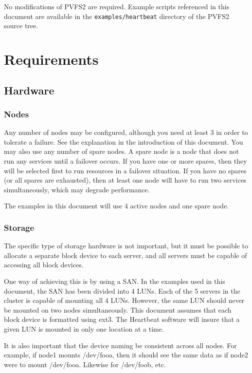 \documentclass[11pt]{article}
\begin{document}
No modifications of PVFS2 are required.  Example scripts referenced in
this document are available in the \texttt{examples/heartbeat} directory of
the PVFS2 source tree.

\section{Requirements}

\subsection{Hardware}

\subsubsection{Nodes}

Any number of nodes may be configured, although you need at least 3 in
order to tolerate a failure.  See the explanation in the introduction of
this document.  You may also use any number of spare nodes.  A spare
node is a node that does not run any services until a failover occurs.
If you have one or more spares, then they will be selected first to run
resources in a failover situation.  If you have no spares (or all spares
are exhausted), then at least one node will have to run two services
simultaneously, which may degrade performance.

The examples in this document will use 4 active nodes and one spare
node.

\subsubsection{Storage}

The specific type of storage hardware is not important, but it must be
possible to allocate a separate block device to each server, and all
servers must be capable of accessing all block devices.

One way of achieving this is by using a SAN.  In the examples used in
this document, the SAN has been divided into 4 LUNs.  Each of the 5
servers in the cluster is capable of mounting all 4 LUNs.  However, the
same LUN should never be mounted on two nodes simultaneously.  This
document assumes that each block device is formatted using ext3.
The Heartbeat software will insure that a given LUN is mounted in only
one location at a time.

It is also important that the device naming be consistent across all
nodes.  For example, if node1 mounts /dev/fooa, then it should see the
same data as if node2 were to mount /dev/fooa.  Likewise for /dev/foob,
etc.
\end{document}
